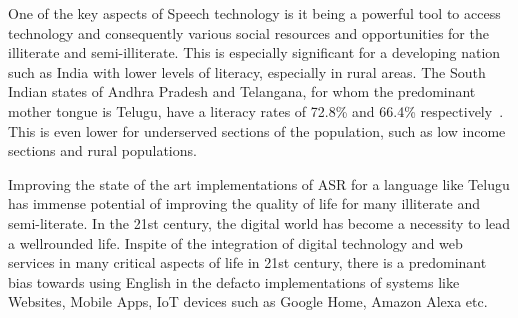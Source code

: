 \documentclass[11pt]{article} \usepackage{spconf,amsmath,graphicx}
\begin{document}
One of the key aspects of Speech technology is it being a powerful tool to
access technology and consequently various social resources and
opportunities for the illiterate and semi-illiterate. This is especially
significant for a developing nation such as India with lower levels of literacy,
especially in rural areas. The South Indian states of Andhra Pradesh and
Telangana, for whom the predominant mother tongue is Telugu, have a literacy
rates of 72.8\% and 66.4\% respectively~\cite{literacyrate}.  This is even lower for underserved
sections of the population, such as low income sections and rural populations. 

Improving the state of the art implementations of ASR for a language like Telugu
has immense potential of improving the quality of life for many illiterate and
semi-literate. In the 21st century, the digital world has become a necessity to
lead a wellrounded life. Inspite of the integration of digital technology and
web services in many critical aspects of life in 21st century, there is a
predominant bias towards using English in the defacto implementations of systems
like Websites, Mobile Apps, IoT devices such as Google Home, Amazon Alexa etc. 







\end{document}
